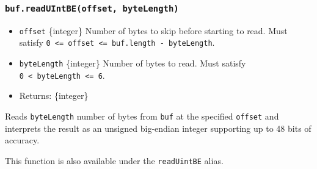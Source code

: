\begin{Shaded}
\begin{Highlighting}[]
\NormalTok{ \{ }\NormalTok{ \} }\OperatorTok{=} \NormalTok{(}\NormalTok{)}\OperatorTok{;}

\OperatorTok{=} \NormalTok{([}\OperatorTok{,} \OperatorTok{,} \OperatorTok{,} \NormalTok{])}\OperatorTok{;}

\NormalTok{(}\NormalTok{)}\NormalTok{(}\NormalTok{))}\OperatorTok{;}
\NormalTok{(}\NormalTok{)}\NormalTok{(}\NormalTok{))}\OperatorTok{;}
\end{Highlighting}
\end{Shaded}

\subsubsection{\texorpdfstring{\texttt{buf.readUIntBE(offset,\ byteLength)}}{buf.readUIntBE(offset, byteLength)}}\label{buf.readuintbeoffset-bytelength}

\begin{itemize}
\tightlist
\item
  \texttt{offset} \{integer\} Number of bytes to skip before starting to
  read. Must satisfy
  \texttt{0\ \textless{}=\ offset\ \textless{}=\ buf.length\ -\ byteLength}.
\item
  \texttt{byteLength} \{integer\} Number of bytes to read. Must satisfy
  \texttt{0\ \textless{}\ byteLength\ \textless{}=\ 6}.
\item
  Returns: \{integer\}
\end{itemize}

Reads \texttt{byteLength} number of bytes from \texttt{buf} at the
specified \texttt{offset} and interprets the result as an unsigned
big-endian integer supporting up to 48 bits of accuracy.

This function is also available under the \texttt{readUintBE} alias.

